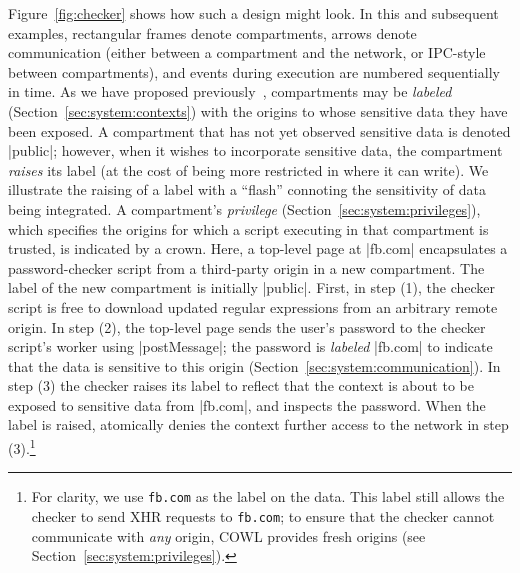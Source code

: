 Figure~\ref{fig:checker} shows how such a design might look. In this
and subsequent examples, rectangular frames denote compartments,
arrows denote communication (either between a compartment and the
network, or IPC-style between compartments), and events during
execution are numbered sequentially in time. As we have proposed
previously~\cite{yang:2013:towards}, compartments may be
\emph{labeled} (Section~\ref{sec:system:contexts}) with the origins to
whose sensitive data they have been exposed. A compartment that has
not yet observed sensitive data is denoted \js|public|; however, when
it wishes to incorporate sensitive data, the compartment \emph{raises}
its label (at the cost of being more restricted in where it can
write). We illustrate the raising of a label with a ``flash''
connoting the sensitivity of data being integrated.  A compartment's
\emph{privilege} (Section~\ref{sec:system:privileges}), which specifies the
origins for which a script executing in that compartment is trusted,
is indicated by a crown. Here, a top-level page at \js|fb.com|
encapsulates a password-checker script from a third-party origin in a
new compartment. The label of the new compartment is initially
\js|public|.
First, in step (1), the checker script is free to
download updated regular expressions from an arbitrary remote
origin. In step (2), the top-level page sends the user's password to
the checker script's worker using \js|postMessage|; the password is
\emph{labeled} \js|fb.com| to indicate that the data is sensitive to
this origin (Section~\ref{sec:system:communication}).
%
%
In step (3) the checker raises its label to reflect that the context
is about to be exposed to sensitive data from \js|fb.com|, and
inspects the password.
%
When the label is raised, \sys{} atomically denies the context further
access to the network in step (3).\footnote{
  For clarity, we use \texttt{fb.com} as the label on the data.  This
  label still allows the checker to send XHR requests to
  \texttt{fb.com}; to ensure that the checker cannot communicate with
  \emph{any} origin, COWL provides fresh origins (see
  Section~\ref{sec:system:privileges}).
}
